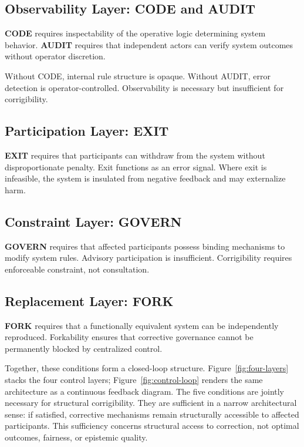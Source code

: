\documentclass{article}
\begin{document}
\subsection{Observability Layer: CODE and AUDIT}

\textbf{CODE} requires inspectability of the operative logic determining system behavior. \textbf{AUDIT} requires that independent actors can verify system outcomes without operator discretion.

Without CODE, internal rule structure is opaque. Without AUDIT, error detection is operator-controlled. Observability is necessary but insufficient for corrigibility.

\subsection{Participation Layer: EXIT}

\textbf{EXIT} requires that participants can withdraw from the system without disproportionate penalty. Exit functions as an error signal. Where exit is infeasible, the system is insulated from negative feedback and may externalize harm.

\subsection{Constraint Layer: GOVERN}

\textbf{GOVERN} requires that affected participants possess binding mechanisms to modify system rules. Advisory participation is insufficient. Corrigibility requires enforceable constraint, not consultation.

\subsection{Replacement Layer: FORK}

\textbf{FORK} requires that a functionally equivalent system can be independently reproduced. Forkability ensures that corrective governance cannot be permanently blocked by centralized control.

Together, these conditions form a closed-loop structure. Figure~\ref{fig:four-layers} stacks the four control layers; Figure~\ref{fig:control-loop} renders the same architecture as a continuous feedback diagram. The five conditions are jointly necessary for structural corrigibility. They are sufficient in a narrow architectural sense: if satisfied, corrective mechanisms remain structurally accessible to affected participants. This sufficiency concerns structural access to correction, not optimal outcomes, fairness, or epistemic quality.
\end{document}
